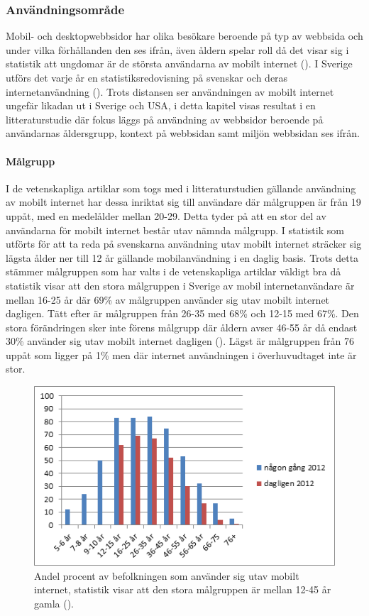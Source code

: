 \documentclass[11pt]{article}
\begin{document}
\subsubsection{Användningsområde}

Mobil- och desktopwebbsidor har olika besökare beroende på typ av webbsida och under vilka förhållanden den ses ifrån, även åldern spelar roll då det visar sig i statistik att ungdomar är de största användarna av mobilt internet (\cite[s.24]{.se}). I Sverige utförs det varje år en statistiksredovisning på svenskar och deras internetanvändning (\cite{.se}). Trots distansen ser användningen av mobilt internet ungefär likadan ut i Sverige och USA, i detta kapitel visas resultat i en litteraturstudie där fokus läggs på användning av webbsidor beroende på användarnas åldersgrupp, kontext på webbsidan samt miljön webbsidan ses ifrån.

\paragraph{Målgrupp}\mbox{}

I de vetenskapliga artiklar som togs med i litteraturstudien gällande användning av mobilt internet har dessa inriktat sig till användare där målgruppen är från 19 uppåt, med en medelålder mellan 20-29. Detta tyder på att en stor del av användarna för mobilt internet består utav nämnda målgrupp. I statistik som utförts för att ta reda på svenskarna användning utav mobilt internet sträcker sig lägsta ålder ner till 12 år gällande mobilanvändning i en daglig basis. Trots detta stämmer målgruppen som har valts i de vetenskapliga artiklar väldigt bra då statistik visar att den stora målgruppen i Sverige av mobil internetanvändare är mellan 16-25 år där 69\% av målgruppen använder sig utav mobilt internet dagligen. Tätt efter är målgruppen från 26-35 med 68\% och 12-15 med 67\%. Den stora förändringen sker inte förens målgrupp där åldern avser 46-55 år då endast 30\% använder sig utav mobilt internet dagligen (\cite[s. 24]{.se}). Lägst är målgruppen från 76 uppåt som ligger på 1\% men där internet användningen i överhuvudtaget inte är stor.
\\
\setcounter{figure}{4}
\begin{figure}[H]
  \centering
    \includegraphics[scale=0.8]{pics/statistikalder.png}
    \caption{Andel procent av befolkningen som använder sig utav mobilt internet, statistik visar att den stora målgruppen är mellan 12-45 år gamla (\cite[s. 24]{.se}).}
\end{figure}
\end{document}
